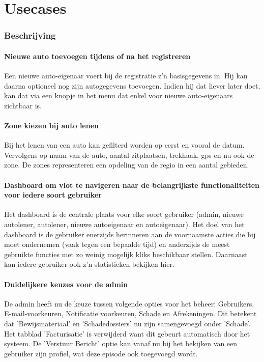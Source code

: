\documentclass[11pt,a4paper,oneside]{article}
\begin{document}
\setcounter{section}{0}
\setcounter{subsection}{0}
\part{Usecases}
\section{Beschrijving}
\subsection{Nieuwe auto toevoegen tijdens of na het registreren}
Een nieuwe auto-eigenaar voert bij de registratie z'n basisgegevens in. Hij kan daarna optioneel nog zijn autogegevens toevoegen. Indien hij dat liever later doet, kan dat via een knopje in het menu dat enkel voor nieuwe auto-eigenaars zichtbaar is.

\subsection{Zone kiezen bij auto lenen}
Bij het lenen van een auto kan gefilterd worden op eerst en vooral de datum. Vervolgens op naam van de auto, aantal zitplaatsen, trekhaak, gps en nu ook de zone. De zones representeren een opdeling van de regio in een aantal gebieden.

\subsection{Dashboard om vlot te navigeren naar de belangrijkste functionaliteiten voor iedere soort gebruiker}
Het dashboard is de centrale plaats voor elke soort gebruiker (admin, nieuwe autolener, autolener, nieuwe autoeigenaar en autoeigenaar). Het doel van het dashboard is de gebruiker enerzijds herinneren aan de voornaamste acties die hij moet ondernemen (vaak tegen een bepaalde tijd) en anderzijds de meest gebruikte functies met zo weinig mogelijk kliks beschikbaar stellen. Daarnaast kan iedere gebruiker ook z'n statistieken bekijken hier.

\subsection{Duidelijkere keuzes voor de admin}
De admin heeft nu de keuze tussen volgende opties voor het beheer: Gebruikers, E-mail-voorkeuren, Notificatie voorkeuren, Schade en Afrekeningen. Dit betekent dat 'Bewijsmateriaal' en 'Schadedossiers' nu zijn samengevoegd onder 'Schade'. Het tabblad 'Facturisatie' is verwijderd want dit gebeurt automatisch door het systeem. De 'Verstuur Bericht' optie kan vanaf nu bij het bekijken van een gebruiker zijn profiel, wat deze episode ook toegevoegd wordt.
\end{document}
